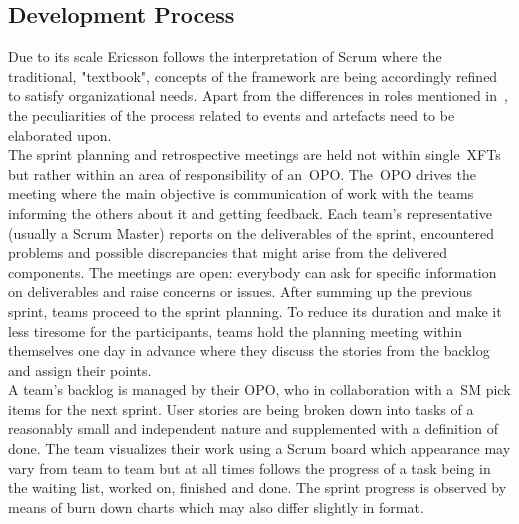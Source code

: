 \subsection{Development Process}

Due to its scale Ericsson follows the interpretation of Scrum where the traditional, "textbook", concepts of the framework are being accordingly refined to satisfy organizational needs. Apart from the differences in roles  mentioned in~, the peculiarities of the process related to events and artefacts need to be elaborated upon.\\
The sprint planning and retrospective meetings are held not within single~\ac{XFT}s but rather within an area of responsibility of an~\ac{OPO}. The~\ac{OPO} drives the meeting where the main objective is communication of work with the teams informing the others about it and getting feedback. Each team's representative (usually a Scrum Master) reports on the deliverables of the sprint, encountered problems and possible discrepancies that might arise from the delivered components. The meetings are open: everybody can ask for specific information on deliverables and raise concerns or issues. After summing up the previous sprint, teams proceed to the sprint planning. To reduce its duration and make it less tiresome for the participants, teams hold the planning meeting within themselves one day in advance where they discuss the stories from the backlog and assign their points.\\
A team's backlog is managed by their \ac{OPO}, who in collaboration with a~\ac{SM} pick items for the next sprint. User stories are being broken down into tasks of a reasonably small and independent nature and supplemented with a definition of done. The team visualizes their work using a Scrum board which appearance may vary from team to team but at all times follows the progress of a task being in the waiting list, worked on, finished and done. The sprint progress is observed by means of burn down charts which may also differ slightly in format.
